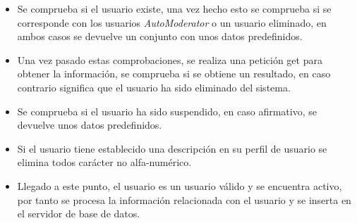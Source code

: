 \documentclass[../../main.tex]{subfiles}
\begin{document}
\begin{itemize}
    \item Se comprueba si el usuario existe, una vez hecho esto se comprueba si se corresponde con los usuarios \textit{AutoModerator} o un usuario eliminado, en ambos casos se devuelve un conjunto con unos datos predefinidos.
    \item Una vez pasado estas comprobaciones, se realiza una petición \gls{get} para obtener la información, se comprueba si se obtiene un resultado, en caso contrario significa que el usuario ha sido eliminado del sistema.
    \item Se comprueba si el usuario ha sido suspendido, en caso afirmativo, se devuelve unos datos predefinidos.
    \item Si el usuario tiene establecido una descripción en su perfil de usuario se elimina todos carácter no alfa-numérico.
    \item Llegado a este punto, el usuario es un usuario válido y se encuentra activo, por tanto se procesa la información relacionada con el usuario y se inserta en el servidor de base de datos.
\end{itemize}
\end{document}
